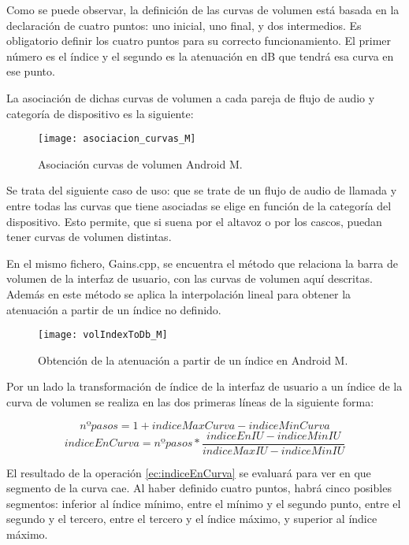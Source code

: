 Como se puede observar, la definición de las curvas de volumen está basada en la declaración de cuatro puntos: uno inicial, uno final, y dos intermedios. Es obligatorio definir los cuatro puntos para su correcto funcionamiento. El primer número es el índice y el segundo es la atenuación en \gls{dB} que tendrá esa curva en ese punto.

La asociación de dichas curvas de volumen a cada pareja de flujo de audio y categoría de dispositivo es la siguiente:

\begin{figure}[H]
	\centering
	\texttt{[image: asociacion\_curvas\_M]}
	\caption{Asociación curvas de volumen Android M.}
	\label{fig:asociacion_curvas_M}
\end{figure}

Se trata del siguiente caso de uso: que se trate de un flujo de audio de llamada y entre todas las curvas que tiene asociadas se elige en función de la categoría del dispositivo. Esto permite, que si suena por el altavoz o por los cascos, puedan tener curvas de volumen distintas.

En el mismo fichero, Gains.cpp, se encuentra el método que relaciona la barra de volumen de la interfaz de usuario, con las curvas de volumen aquí descritas. Además en este método se aplica la interpolación lineal para obtener la atenuación a partir de un índice no definido.

\begin{figure}[H]
	\centering
	\texttt{[image: volIndexToDb\_M]}
	\caption{Obtención de la atenuación a partir de un índice en Android M.}
	\label{fig:index_to_db_M}
\end{figure}

Por un lado la transformación de índice de la interfaz de usuario a un índice de la curva de volumen se realiza en las dos primeras líneas de la siguiente forma:

\begin{equation}
	nº pasos=1+indiceMaxCurva - indiceMinCurva
\end{equation}
\begin{equation}\label{ec:indiceEnCurva}
	indiceEnCurva= nºpasos*\frac{indiceEnIU - indiceMinIU
	}{indiceMaxIU-indiceMinIU}
\end{equation}

El resultado de la operación \ref{ec:indiceEnCurva} se evaluará para ver en que segmento de la curva cae. Al haber definido cuatro puntos, habrá cinco posibles segmentos: inferior al índice mínimo, entre el mínimo y el segundo punto, entre el segundo y el tercero, entre el tercero y el índice máximo, y superior al índice máximo. 

